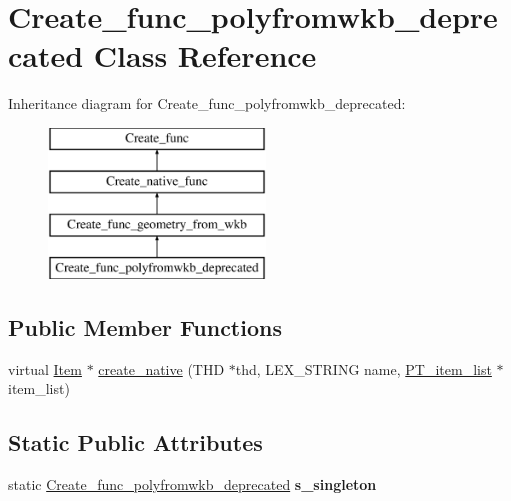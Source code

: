 \hypertarget{classCreate__func__polyfromwkb__deprecated}{}\section{Create\+\_\+func\+\_\+polyfromwkb\+\_\+deprecated Class Reference}
\label{classCreate__func__polyfromwkb__deprecated}
Inheritance diagram for Create\+\_\+func\+\_\+polyfromwkb\+\_\+deprecated\+:\begin{figure}[H]
\begin{center}
\leavevmode
\includegraphics[height=4.000000cm]{classCreate__func__polyfromwkb__deprecated}
\end{center}
\end{figure}
\subsection*{Public Member Functions}
\begin{DoxyCompactItemize}
\item 
virtual \mbox{\hyperlink{classItem}{Item}} $\ast$ \mbox{\hyperlink{classCreate__func__polyfromwkb__deprecated_a918890964239746813b0bf0786c89370}{create\+\_\+native}} (T\+HD $\ast$thd, L\+E\+X\+\_\+\+S\+T\+R\+I\+NG name, \mbox{\hyperlink{classPT__item__list}{P\+T\+\_\+item\+\_\+list}} $\ast$item\+\_\+list)
\end{DoxyCompactItemize}
\subsection*{Static Public Attributes}
\begin{DoxyCompactItemize}
\item 
\mbox{\label{classCreate__func__polyfromwkb__deprecated_a6b791e6e33da51e1142c167171c1b7e9}} 
static \mbox{\hyperlink{classCreate__func__polyfromwkb__deprecated}{Create\+\_\+func\+\_\+polyfromwkb\+\_\+deprecated}} {\bfseries s\+\_\+singleton}
\end{DoxyCompactItemize}
